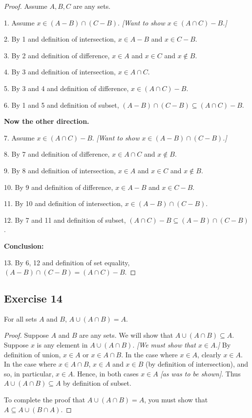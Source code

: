\documentclass[14pt]{extarticle}
\begin{document}
\begin{proof}
  Assume $A,B,C$ are any sets.

  1. Assume \(x \in (A - B) \cap (C - B)\). {\it [Want to show \(x \in (A \cap C) - B\).]}

  2. By 1 and definition of intersection, \(x \in A - B\) and \(x \in C - B\).

  3. By 2 and definition of difference, $x \in A$ and $x \in C$ and $x \notin B$.

  4. By 3 and definition of intersection, \(x \in A \cap C\).

  5. By 3 and 4 and definition of difference, \(x \in (A \cap C) - B\).

  6. By 1 and 5 and definition of subset, \((A - B) \cap (C - B) \subseteq (A \cap C) - B\).

    {\bf Now the other direction.}

  7. Assume \(x \in (A \cap C) - B\). {\it [Want to show \(x \in (A - B) \cap (C - B)\).]}

  8. By 7 and definition of difference, \(x \in A \cap C\) and \(x \notin B\).

  9. By 8 and definition of intersection, $x \in A$ and $x \in C$ and $x \notin B$.

  10. By 9 and definition of difference, \(x \in A - B\) and \(x \in C - B\).

  11. By 10 and definition of intersection, \(x \in (A - B) \cap (C - B)\).

  12. By 7 and 11 and definition of subset, \((A \cap C) - B \subseteq (A - B) \cap (C - B)\).

    {\bf Conclusion:}

  13. By 6, 12 and definition of set equality, \((A - B) \cap (C - B) = (A \cap C) - B\).
\end{proof}

\subsection{Exercise 14}
For all sets $A$ and $B$, \(A \cup (A \cap B) = A\).

\begin{proof}
  Suppose $A$ and $B$ are any sets. We will show that \(A \cup (A \cap B) \subseteq A\).
  Suppose $x$ is any element in \(A \cup (A \cap B)\). {\it [We must show that \(x \in A\).]} By definition of union,
  \(x \in A\) or \(x \in A \cap B\). In the case where \(x \in A\), clearly \(x \in A\). In the case where
  \(x \in A \cap B\), \(x \in A\) and \(x \in B\) (by definition of intersection), and so, in particular,
  \(x \in A\). Hence, in both cases \(x \in A\) {\it [as was to be shown]}. Thus \(A \cup (A \cap B) \subseteq A\) by
  definition of subset.

  To complete the proof that \(A \cup (A \cap B) = A\), you must show that \(A \subseteq A \cup (B \cap A)\).
\end{proof}
\end{document}
